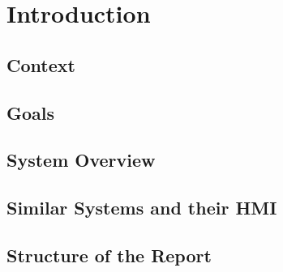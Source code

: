 \chapter{Introduction}\label{sec:introduction}


\section{Context}

\section{Goals}

\section{System Overview}

\section{Similar Systems and their HMI}

\section{Structure of the Report}